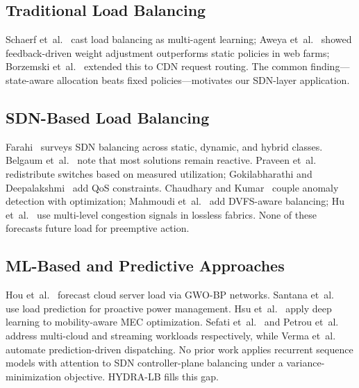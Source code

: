 \documentclass[conference]{IEEEtran}
\begin{document}
\subsection{Traditional Load Balancing}

Schaerf et~al.~\cite{schaerf1994adaptive} cast load balancing as multi-agent learning; Aweya et~al.~\cite{aweya2002adaptive} showed feedback-driven weight adjustment outperforms static policies in web farms; Borzemski et~al.~\cite{borzemski2007adaptive} extended this to CDN request routing. The common finding---state-aware allocation beats fixed policies---motivates our SDN-layer application.

\subsection{SDN-Based Load Balancing}

Farahi~\cite{farahi2025comprehensive} surveys SDN balancing across static, dynamic, and hybrid classes. Belgaum et~al.~\cite{belgaum2020systematic} note that most solutions remain reactive. Praveen et~al.~\cite{praveen2022adaptive} redistribute switches based on measured utilization; Gokilabharathi and Deepalakshmi~\cite{gokilabharathi2018efficient} add QoS constraints. Chaudhary and Kumar~\cite{chaudhary2019loads} couple anomaly detection with optimization; Mahmoudi et~al.~\cite{mahmoudi2022sdn} add DVFS-aware balancing; Hu et~al.~\cite{hu2024load} use multi-level congestion signals in lossless fabrics. None of these forecasts future load for preemptive action.

\subsection{ML-Based and Predictive Approaches}

Hou et~al.~\cite{hou2021research} forecast cloud server load via GWO-BP networks. Santana et~al.~\cite{santana2011power} use load prediction for proactive power management. Hsu et~al.~\cite{hsu2021mobility} apply deep learning to mobility-aware MEC optimization. Sefati et~al.~\cite{sefati2025probabilistic} and Petrou et~al.~\cite{petrou2021weighted} address multi-cloud and streaming workloads respectively, while Verma et~al.~\cite{verma2011automated} automate prediction-driven dispatching. No prior work applies recurrent sequence models with attention to SDN controller-plane balancing under a variance-minimization objective. HYDRA-LB fills this gap.

\end{document}
